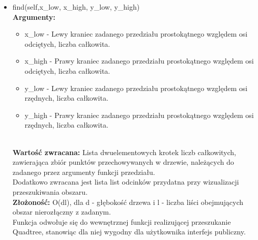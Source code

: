 \documentclass{article}
\begin{document}
\begin{itemize}
                    \item find(self,x\_low, x\_high, y\_low, y\_high)\\
                        \textbf{Argumenty:} \begin{itemize}
                                \item x\_low - Lewy kraniec zadanego przedziału prostokątnego względem osi odciętych, liczba całkowita. 
                                \item x\_high - Prawy kraniec zadanego przedziału prostokątnego względem osi odciętych, liczba całkowita. 
                                \item y\_low - Lewy kraniec zadanego przedziału prostokątnego względem osi rzędnych, liczba całkowita. 
                                \item y\_high - Prawy kraniec zadanego przedziału prostokątnego względem osi rzędnych, liczba całkowita. 
                            \end{itemize}\\
                        \textbf{Wartość zwracana:} Lista dwuelementowych krotek liczb całkowitych, zawierająca zbiór punktów przechowywanych w drzewie, należących do zadanego przez argumenty funkcji przedziału.\\
                        Dodatkowo zwracana jest lista list odcinków przydatna przy wizualizacji przeszukiwania obszaru.
                        \\
                        \textbf{Złożoność:} O(dl), dla d - głębokość drzewa i l - liczba liści obejmujących obszar nierozłączny z zadanym.\\
                        Funkcja odwołuje się do wewnętrznej funkcji realizującej przeszukanie Quadtree, stanowiąc dla niej wygodny dla użytkownika interfejs publiczny. 
                        

\end{itemize}
\end{document}
